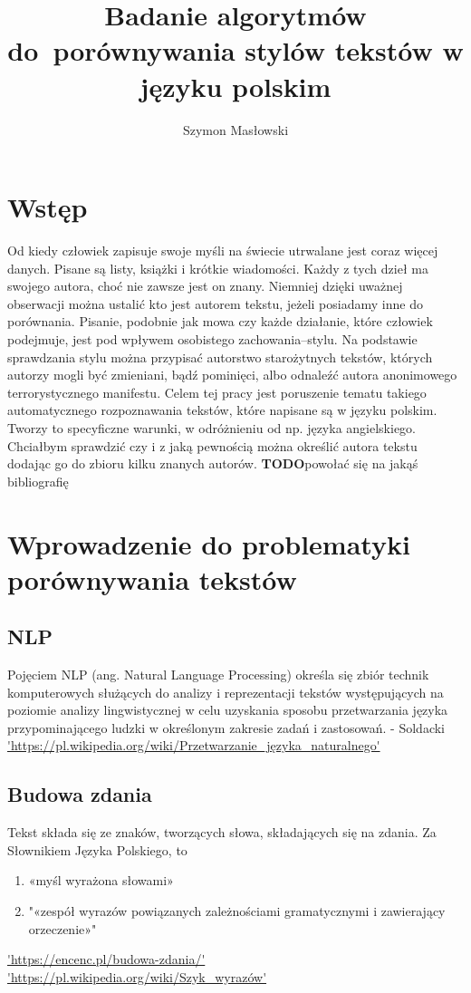 \documentclass[a4paper,12pt,twoside,openany]{report}
\title{Badanie algorytmów \linebreak[1]do~porównywania stylów tekstów w języku polskim}
\author{Szymon Masłowski}
\newcommand{\TODO}{\textbf{TODO}}
\begin{document}
\maketitle

\chapter{Wstęp}

Od kiedy człowiek zapisuje swoje myśli na świecie utrwalane jest coraz więcej danych. Pisane są listy, książki i krótkie wiadomości. Każdy z tych dzieł ma swojego autora, choć nie zawsze jest on znany. Niemniej dzięki uważnej obserwacji można ustalić kto jest autorem tekstu, jeżeli posiadamy inne do porównania. Pisanie, podobnie jak mowa czy każde działanie, które człowiek podejmuje, jest pod wpływem osobistego zachowania--stylu. Na podstawie sprawdzania stylu można przypisać autorstwo starożytnych tekstów, których autorzy mogli być zmieniani, bądź pominięci, albo odnaleźć autora anonimowego terrorystycznego manifestu. 
Celem tej pracy jest poruszenie tematu takiego automatycznego rozpoznawania tekstów, które napisane są w języku polskim. Tworzy to specyficzne warunki, w odróżnieniu od np. języka angielskiego. Chciałbym sprawdzić czy i z jaką pewnością można określić autora tekstu dodając go do zbioru kilku znanych autorów.
\TODO powołać się na jakąś bibliografię


\chapter{Wprowadzenie do problematyki porównywania tekstów}

\section{NLP}
Pojęciem NLP (ang. Natural Language Processing) określa się zbiór technik komputerowych służących do analizy i reprezentacji tekstów występujących na poziomie analizy lingwistycznej w celu uzyskania sposobu przetwarzania języka przypominającego ludzki w określonym zakresie zadań i zastosowań. - Soldacki
\url{'https://pl.wikipedia.org/wiki/Przetwarzanie_języka_naturalnego'}
	
\section{Budowa zdania}
Tekst składa się ze znaków, tworzących słowa, składających się na zdania. Za Słownikiem Języka Polskiego, to 
\begin{enumerate}
	\item «myśl wyrażona słowami»
	\item "«zespół wyrazów powiązanych zależnościami gramatycznymi i zawierający orzeczenie»"
\end{enumerate}
\url{'https://encenc.pl/budowa-zdania/'}
\url{'https://pl.wikipedia.org/wiki/Szyk_wyrazów'}
\end{document}
